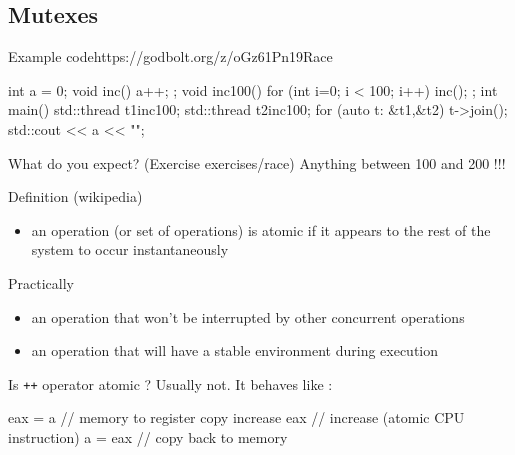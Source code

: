\subsection[mutex]{Mutexes}

\begin{frame}[fragile]
  \begin{exampleblockGB}{Example code}{https://godbolt.org/z/oGz61Pn19}{Race}
    \begin{cppcode*}{}
      int a = 0;
      void inc() { a++; };
      void inc100() {
        for (int i=0; i < 100; i++) inc();
      };
      int main() {
        std::thread t1{inc100};
        std::thread t2{inc100};
        for (auto t: {&t1,&t2}) t->join();
        std::cout << a << "\n";
      }
    \end{cppcode*}
  \end{exampleblockGB}
  \pause
  \begin{block}{What do you expect? (Exercise exercises/race)}
    \pause
    Anything between 100 and 200 !!!
  \end{block}
\end{frame}

\begin{frame}[fragile]
  \begin{exampleblock}{Definition (wikipedia)}
    \begin{itemize}
    \item an operation (or set of operations) is atomic if it appears to the rest of the system to occur instantaneously
    \end{itemize}
  \end{exampleblock}
  \begin{block}{Practically}
    \begin{itemize}
    \item an operation that won't be interrupted by other concurrent operations
    \item an operation that will have a stable environment during execution
    \end{itemize}
  \end{block}
  \pause
  \begin{alertblock}{Is \texttt{++} operator atomic ?}
    \pause
    Usually not. It behaves like :
    \begin{cppcode*}{}
      eax = a       // memory to register copy
      increase eax  // increase (atomic CPU instruction)
      a = eax       // copy back to memory
    \end{cppcode*}
  \end{alertblock}
\end{frame}

